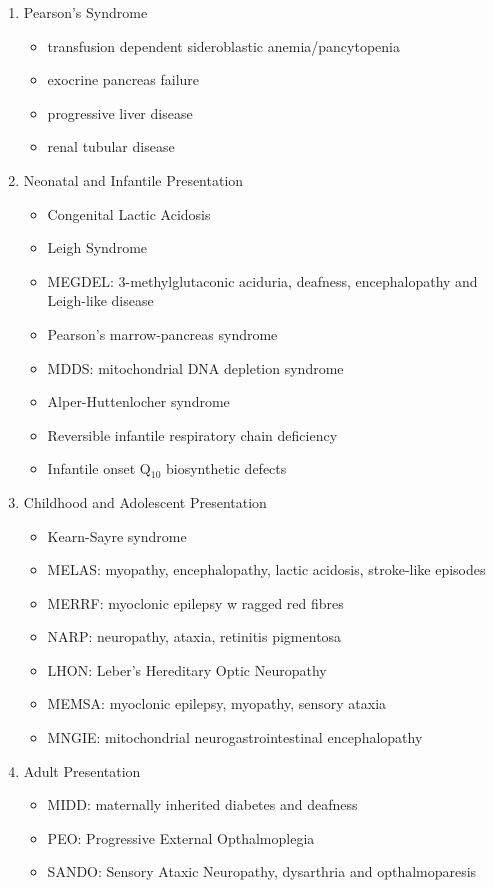 \documentclass{scrartcl}
\begin{document}
\begin{enumerate}
\item Pearson's Syndrome
\label{sec:orge559267}
\begin{itemize}
\item transfusion dependent sideroblastic anemia/pancytopenia
\item exocrine pancreas failure
\item progressive liver disease
\item renal tubular disease
\end{itemize}

\item Neonatal and Infantile Presentation
\label{sec:org3db90fe}
\begin{itemize}
\item Congenital Lactic Acidosis
\item Leigh Syndrome
\item MEGDEL: 3-methylglutaconic aciduria, deafness, encephalopathy and Leigh-like disease
\item Pearson's marrow-pancreas syndrome
\item MDDS: mitochondrial DNA depletion syndrome
\item Alper-Huttenlocher syndrome
\item Reversible infantile respiratory chain deficiency
\item Infantile onset Q\(_{\text{10}}\) biosynthetic defects
\end{itemize}

\item Childhood and Adolescent Presentation
\label{sec:org1c782bd}
\begin{itemize}
\item Kearn-Sayre syndrome
\item MELAS: myopathy, encephalopathy, lactic acidosis, stroke-like episodes
\item MERRF: myoclonic epilepsy w ragged red fibres
\item NARP: neuropathy, ataxia, retinitis pigmentosa
\item LHON: Leber's Hereditary Optic Neuropathy
\item MEMSA: myoclonic epilepsy, myopathy, sensory ataxia
\item MNGIE: mitochondrial neurogastrointestinal encephalopathy
\end{itemize}

\item Adult Presentation
\label{sec:orgb4910eb}
\begin{itemize}
\item MIDD: maternally inherited diabetes and deafness
\item PEO: Progressive External Opthalmoplegia
\item SANDO: Sensory Ataxic Neuropathy, dysarthria and opthalmoparesis
\end{itemize}
\end{enumerate}
\end{document}

